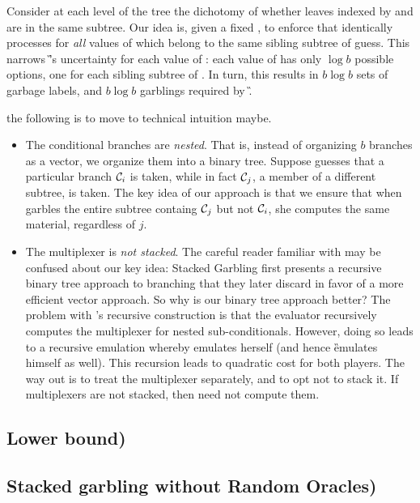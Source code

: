 Consider at each level of the tree the dichotomy of whether leaves indexed by \guess and \truth are in the same subtree. Our idea is, given a fixed \guess, to  enforce that \E identically processes \guess for {\em all} values of \truth which belong to the same sibling subtree of guess. This narrows \G’s uncertainty for each value of \guess: each value of \guess has only $\log b$ possible \truth options, one for each sibling subtree of \guess.  In turn, this results in $b\log b$  sets of garbage labels, and $b\log b$ garblings required by \G. 


\medskip



the following is to move to technical intuition maybe.
\begin{itemize}
	
	\item The conditional branches are \emph{nested}.
	That is, instead of organizing $b$ branches as a vector, we
	organize them into a binary tree.
	Suppose \E guesses that a particular branch $\mathcal C_i$ is taken,
	while in fact $\mathcal C_j$, a member of a different subtree, is taken.
	The key idea of our approach is that we ensure that when \ev
	garbles the entire subtree containg $\mathcal C_j$ but not $\mathcal C_i$, she
	computes the same material, regardless of $j$.
	\item The multiplexer is \emph{not stacked}.
	The careful reader familiar with \cite{EPRINT:HeaKol20b} may be
	confused about our key idea: Stacked Garbling first presents a
	recursive binary tree approach to branching that they later
	discard in favor of a more efficient vector approach.
	So why is our binary tree approach better?
	The problem with \cite{EPRINT:HeaKol20b}'s recursive construction
	is that the evaluator recursively computes the multiplexer for
	nested sub-conditionals.
	However, doing so leads to a recursive emulation whereby \E
	emulates herself (and hence \G emulates himself as well).
	This recursion leads to quadratic cost for both players.
	The way out is to treat the multiplexer separately, and to opt not
	to stack it.
	If multiplexers are not stacked, then \E need not compute them.
\end{itemize}







\subsection{Lower bound)}
\label{sec:techOverviewLB}






\subsection{Stacked garbling without Random Oracles)}
\label{sec:techOverviewRO}




